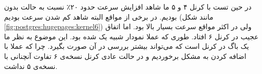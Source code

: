 در حین تست با کرنل  ۴ و ۵ ما شاهد افزایش سرعت حدود ۲۰٪ نسبت به حالت بدون
بودیم. در برخی از مواقع البته شاهد کم شدن سرعت بودیم
(مانند شکل
\ref{fig:postgres:hugepages:kernel6})
ولی در اکثر مواقع سرعت بسیار بالا بود.
اما اتفاق عجیب در کرنل ۶ افتاد. طوری که عملا نمودار
شبیه یک
شده بود. این موضوع به نظر ما یک باگ در کرنل است که می‌تواند بیشتر بررسی در آن صورت بگیرد. چرا که
عملا با اضافه کردن
به مشکل برخوردیم و در حالت عادی کرنل نسخه‌ی ۶ تفاوت آنچنانی با نسخه‌ی ۵ نداشت.
\begin{figure}[H]
    \centering
    \quad

\end{figure}
